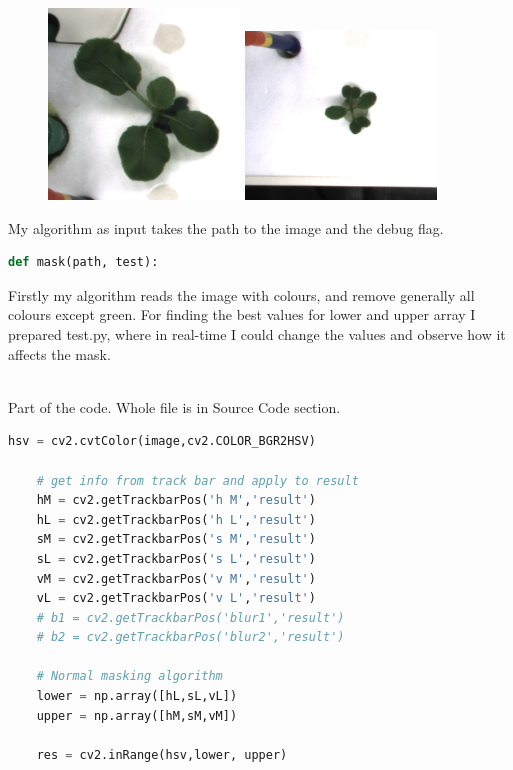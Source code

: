 \documentclass[12pt]{article}
\begin{document}
\begin{center}
\begin{figure}[h!]
\centering
\includegraphics[width = 2in]{rgb_00_00_008_03.png}
\hspace{1cm}
\includegraphics[width = 2in]{rgb_00_04_002_05.png}
\end{figure}
\end{center}

My algorithm as input takes the path to the image and the debug flag.

\begin{lstlisting}[language=Python]
def mask(path, test):
\end{lstlisting}

Firstly my algorithm reads the image with colours, and remove generally all colours except green. For finding the best values for lower and upper array I prepared test.py, where in real-time I could change the values and observe how it affects the mask.\\\\

\newpage

Part of the code. Whole file is in Source Code section.

\begin{lstlisting}[language=Python]
    hsv = cv2.cvtColor(image,cv2.COLOR_BGR2HSV)

    # get info from track bar and apply to result
    hM = cv2.getTrackbarPos('h M','result')
    hL = cv2.getTrackbarPos('h L','result')
    sM = cv2.getTrackbarPos('s M','result')
    sL = cv2.getTrackbarPos('s L','result')
    vM = cv2.getTrackbarPos('v M','result')
    vL = cv2.getTrackbarPos('v L','result')
    # b1 = cv2.getTrackbarPos('blur1','result')
    # b2 = cv2.getTrackbarPos('blur2','result')

    # Normal masking algorithm
    lower = np.array([hL,sL,vL])
    upper = np.array([hM,sM,vM])

    res = cv2.inRange(hsv,lower, upper)
\end{lstlisting}
\end{document}
